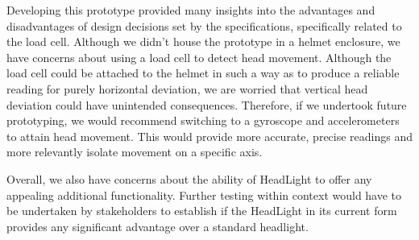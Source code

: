 \documentclass[twoside]{article}
\begin{document}
    Developing this prototype provided many insights into the advantages and disadvantages of design decisions set by the specifications, specifically related to the load cell. Although we didn't house the prototype in a helmet enclosure, we have concerns about using a load cell to detect head movement. Although the load cell could be attached to the helmet in such a way as to produce a reliable reading for purely horizontal deviation, we are worried that vertical head deviation could have unintended consequences. Therefore, if we undertook future prototyping, we would recommend switching to a gyroscope and accelerometers to attain head movement. This would provide more accurate, precise readings and more relevantly isolate movement on a specific axis. 

    Overall, we also have concerns about the ability of HeadLight to offer any appealing additional functionality. Further testing within context would have to be undertaken by stakeholders to establish if the HeadLight in its current form provides any significant advantage over a standard headlight.

\newpage
\printbibliography
\end{document}
